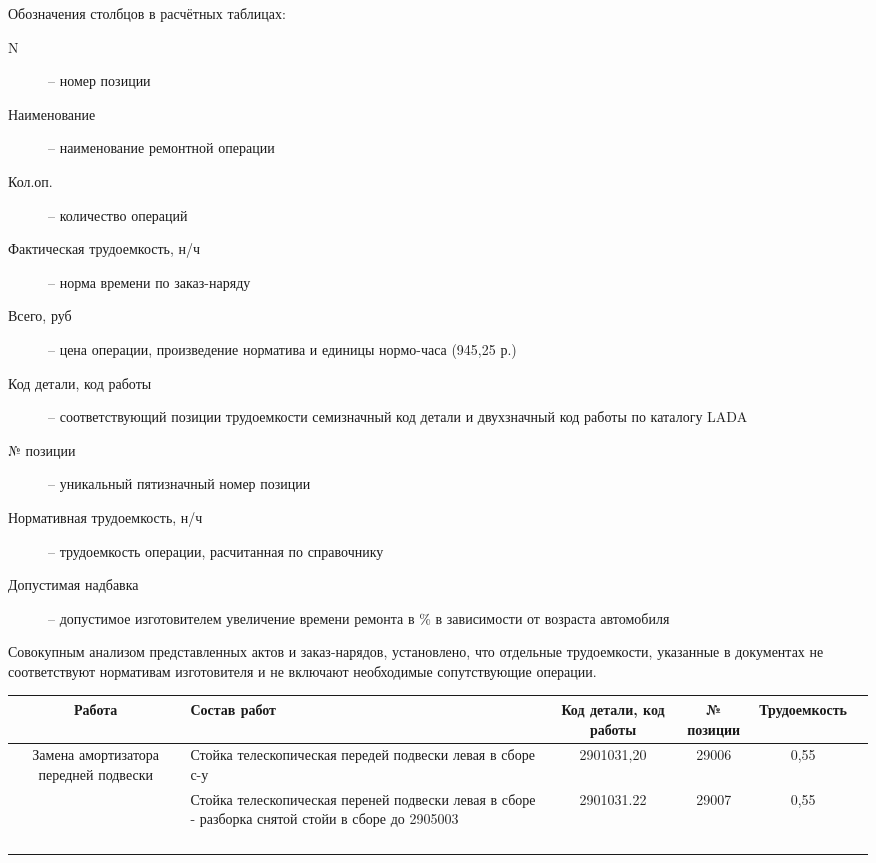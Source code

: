 Обозначения столбцов в расчётных таблицах:
\begin{description}
	\item[N] -- номер позиции
	\item[Наименование] -- наименование ремонтной операции 
	\item[Кол.оп.] -- количество операций
	\item[Фактическая трудоемкость, н/ч] -- норма времени по заказ-наряду
	\item[Всего, руб] -- цена операции, произведение норматива и единицы нормо-часа (945,25 р.)
	\item[Код детали, код работы] -- соответствующий  позиции трудоемкости  семизначный код детали и двухзначный код  работы по каталогу LADA
	\item[№ позиции] -- уникальный пятизначный номер позиции	
	\item[Нормативная трудоемкость, н/ч] -- трудоемкость операции, расчитанная по справочнику
	\item[Допустимая надбавка] -- допустимое изготовителем увеличение времени ремонта  в  \% в зависимости от возраста автомобиля
\end{description} 

\vspace{3mm}

Совокупным анализом представленных актов и заказ-нарядов, установлено, что отдельные трудоемкости, указанные в документах не соответствуют нормативам изготовителя и не включают необходимые сопутствующие операции.\\

\begin{tabular}{|c|c|l|c|c|c|c|}
	\hline
	\multicolumn{2}{|c|}{Работа} & Состав работ & Код детали, код работы & № позиции & Трудоемкость &  \\
	\hline
	\multicolumn{2}{|c|}{Замена амортизатора передней подвески} & Стойка телескопическая передей подвески левая в сборе с-у & 2901031,20 & 29006 & 0,55 &  \\
	\hline
	\multicolumn{2}{|c|}{} & Стойка телескопическая переней подвески левая в сборе - разборка снятой стойи в сборе до 2905003 & 2901031.22 & 29007 & 0,55 &  \\
	\hline
	&  &  &  &  &  &  \\
	\hline
	&  &  &  &  &  &  \\
	\hline
	&  &  &  &  &  &  \\
	\hline
	&  &  &  &  &  &  \\
	\hline
\end{tabular}



